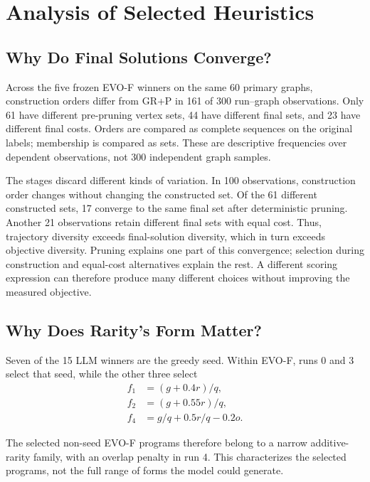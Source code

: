 \section{Analysis of Selected Heuristics}
\label{sec:selected}
\subsection{Why Do Final Solutions Converge?}

Across the five frozen EVO-F winners on the same 60 primary graphs,
construction orders differ from GR+P in 161 of 300 run--graph observations.
Only 61 have different pre-pruning vertex sets, 44 have different final
sets, and 23 have different final costs. Orders are compared as complete
sequences on the original labels; membership is compared as sets.
These are descriptive frequencies over dependent observations, not
300 independent graph samples.

The stages discard different kinds of variation. In 100 observations,
construction order changes without changing the constructed set.
Of the 61 different constructed sets, 17 converge to the same final set
after deterministic pruning. Another 21 observations retain different
final sets with equal cost. Thus, trajectory diversity exceeds
final-solution diversity, which in turn exceeds objective diversity.
Pruning explains one part of this convergence; selection during
construction and equal-cost alternatives explain the rest. A different
scoring expression can therefore produce many different choices without
improving the measured objective.

\begin{samepage}
\subsection{Why Does Rarity's Form Matter?}
\label{sec:rarity_form}

Seven of the 15 LLM winners are the greedy seed. Within EVO-F, runs 0
and 3 select that seed, while the other three select
\begin{equation}
\begin{aligned}
f_1 &= (g+0.4r)/q,\\
f_2 &= (g+0.55r)/q,\\
f_4 &= g/q+0.5r/q-0.2o.
\end{aligned}
\label{eq:selected_forms}
\end{equation}
\end{samepage}
The selected non-seed EVO-F programs therefore belong to a narrow
additive-rarity family, with an overlap penalty in run 4. This
characterizes the selected programs, not the full range of forms the
model could generate.

